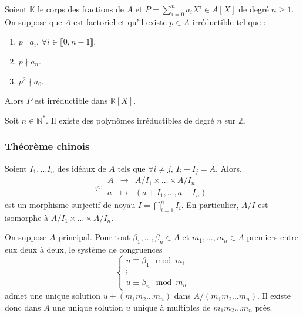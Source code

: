   \begin{theorem}
    Soient $\mathbb{K}$ le corps des fractions de $A$ et $P = \sum_{i=0}^n a_i X^i \in A[X]$ de degré $n \geq 1$. On suppose que $A$ est factoriel et qu'il existe $p \in A$ irréductible tel que :
    \begin{enumerate}[label=(\roman*)]
      \item $p \mid a_i$, $\forall i \in \llbracket 0, n-1 \rrbracket$.
      \item $p \nmid a_n$.
      \item $p^2 \nmid a_0$.
    \end{enumerate}
    Alors $P$ est irréductible dans $\mathbb{K}[X]$.
  \end{theorem}


  \begin{application}
    Soit $n \in \mathbb{N}^*$. Il existe des polynômes irréductibles de degré $n$ sur $\mathbb{Z}$.
  \end{application}

  \subsubsection{Théorème chinois}


  \begin{theorem}[Chinois]
    Soient $I_1, \dots I_n$ des idéaux de $A$ tels que $\forall i \neq j, \, I_i + I_j = A$. Alors,
    \[
      \varphi :
      \begin{array}{ccc}
        A &\rightarrow& A/I_1 \times \dots \times A/I_n \\
        a &\mapsto& (a + I_1, \dots, a + I_n)
      \end{array}
    \]
    est un morphisme surjectif de noyau $I = \bigcap_{i=1}^n I_i$. En particulier, $A/I$ est isomorphe à $A/I_1 \times \dots \times A/I_n$.
  \end{theorem}

  \begin{corollary}
    On suppose $A$ principal. Pour tout $\beta_1, \dots, \beta_n \in A$ et $m_1, \dots, m_n \in A$ premiers entre eux deux à deux, le système de congruences
    \[
      \begin{cases}
        u \equiv \beta_1 \mod m_1 \\
        \vdots \\
        u \equiv \beta_n \mod m_n
      \end{cases}
    \]
    admet une unique solution $u + (m_1 m_2 \dots m_n)$ dans $A / (m_1 m_2 \dots m_n)$. Il existe donc dans $A$ une unique solution $u$ unique à multiples de $m_1 m_2 \dots m_n$ près.
  \end{corollary}

